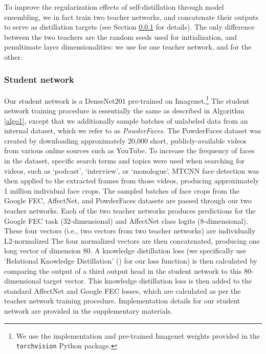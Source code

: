 \documentclass[times,twocolumn,final,authoryear]{elsarticle}
\begin{document}
	To improve the regularization effects of self-distillation through model ensembling, we in fact train two teacher networks, and concatenate their outputs to serve as distillation targets (see Section \ref{sec:student} for details). The only difference between the two teachers are the random seeds used for initialization, and penultimate layer dimensionalities: we use  for one teacher network, and  for the other.
	
	\subsubsection{Student network}
	\label{sec:student}
	
	Our student network is a DenseNet201 pre-trained on Imagenet.\footnote{We use the implementation and pre-trained Imagenet weights provided in the \texttt{torchvision} Python package.} The student network training procedure is essentially the same as described in Algorithm \ref{algo1}, except that we additionally sample batches of unlabeled data from an internal dataset, which we refer to as \textit{PowderFaces}. The PowderFaces dataset was created by downloading approximately 20,000 short, publicly-available videos from various online sources such as YouTube. To increase the frequency of faces in the dataset, specific search terms and topics were used when searching for videos, such as `podcast', `interview', or `monologue'. MTCNN face detection was then applied to the extracted frames from those videos, producing approximately 1 million individual face crops. The sampled batches of face crops from the Google FEC, AffectNet, and PowderFaces datasets are passed through our two teacher networks. Each of the two teacher networks produces predictions for the Google FEC task (32-dimensional) and AffectNet class logits (8-dimensional). These four vectors (i.e., two vectors from two teacher networks) are individually L2-normalized The four normalized vectors are then concatenated, producing one long vector of dimension 80. A knowledge distillation loss (we specifically use `Relational Knowledge Distillation' (\cite{park2019relational}) for our loss function) is then calculated by comparing the output of a third output head in the student network to this 80-dimensional target vector. This knowledge distillation loss is then added to the standard AffectNet and Google FEC losses, which are calculated as per the teacher network training procedure. Implementation details for our student network are provided in the supplementary materials.
	
\end{document}
